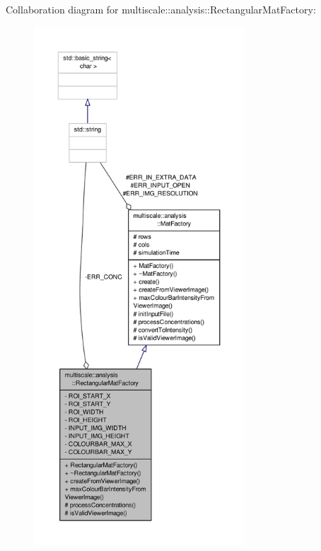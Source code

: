 Collaboration diagram for multiscale\-:\-:analysis\-:\-:Rectangular\-Mat\-Factory\-:\nopagebreak
\begin{figure}[H]
\begin{center}
\leavevmode
\includegraphics[height=550pt]{classmultiscale_1_1analysis_1_1RectangularMatFactory__coll__graph}
\end{center}
\end{figure}
